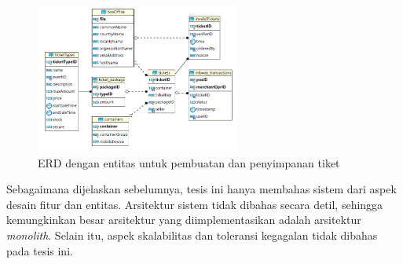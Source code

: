 \begin{figure}[htbp]
    \centering
    \includegraphics[width=0.6\textwidth]{resources/chapter-2/er-ticket-storage.png}
    \caption{ERD dengan entitas untuk pembuatan dan penyimpanan tiket \parencite{backendForTicketing}}
    \label{fig:ticket-storage}
\end{figure}

Sebagaimana dijelaskan sebelumnya, tesis ini hanya membahas sistem dari aspek desain fitur dan entitas. Arsitektur sistem tidak dibahas secara detil, sehingga kemungkinkan besar arsitektur yang diimplementasikan adalah arsitektur \textit{monolith}. Selain itu, aspek skalabilitas dan toleransi kegagalan tidak dibahas pada tesis ini.
